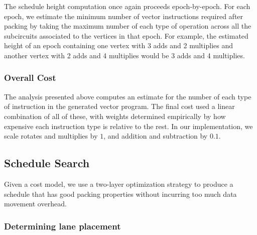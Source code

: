The schedule height computation once again proceeds epoch-by-epoch.
For each epoch, we estimate the minimum number of vector instructions required after packing by taking the maximum number of each type of operation across all the subcircuits associated to the vertices in that epoch.
For example, the estimated height of an epoch containing one vertex with 3 adds and 2 multiplies and another vertex with 2 adds and 4 multiplies would be 3 adds and 4 multiplies. 

\subsubsection*{Overall Cost}
The analysis presented above computes an estimate for the number of each type of instruction in the generated vector program.
The final cost used a linear combination of all of these, with weights determined empirically by how expensive each instruction type is relative to the rest.
In our implementation, we scale rotates and multiplies by $1$, and addition and subtraction by $0.1$. 

\subsection{Schedule Search}\label{sec:schedule-search}
Given a cost model, we use a two-layer optimization strategy to produce a schedule that has good packing properties without incurring too much data movement overhead.
\subsubsection*{Determining lane placement}
    

